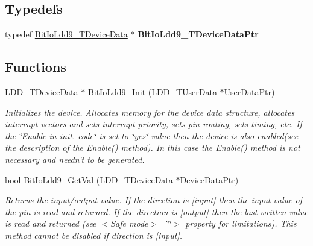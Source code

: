 \subsection*{Typedefs}
\begin{DoxyCompactItemize}
\item 
\hypertarget{group___bit_io_ldd9__module_ga14c5f1bba4476bfea732ee53bcbc3785}{typedef \hyperlink{struct_bit_io_ldd9___t_device_data}{Bit\-Io\-Ldd9\-\_\-\-T\-Device\-Data} $\ast$ {\bfseries Bit\-Io\-Ldd9\-\_\-\-T\-Device\-Data\-Ptr}}\label{group___bit_io_ldd9__module_ga14c5f1bba4476bfea732ee53bcbc3785}

\end{DoxyCompactItemize}
\subsection*{Functions}
\begin{DoxyCompactItemize}
\item 
\hyperlink{group___p_e___types__module_gac5cf1362f1f0e3a2ce71b1bf2276d091}{L\-D\-D\-\_\-\-T\-Device\-Data} $\ast$ \hyperlink{group___bit_io_ldd9__module_gad80d9c6b4e1521197f673e702034e626}{Bit\-Io\-Ldd9\-\_\-\-Init} (\hyperlink{group___p_e___types__module_ga0b66a73f87238a782318aa0be7578e35}{L\-D\-D\-\_\-\-T\-User\-Data} $\ast$User\-Data\-Ptr)
\begin{DoxyCompactList}\small\item\em Initializes the device. Allocates memory for the device data structure, allocates interrupt vectors and sets interrupt priority, sets pin routing, sets timing, etc. If the \char`\"{}\-Enable
    in init. code\char`\"{} is set to \char`\"{}yes\char`\"{} value then the device is also enabled(see the description of the Enable() method). In this case the Enable() method is not necessary and needn't to be generated. \end{DoxyCompactList}\item 
bool \hyperlink{group___bit_io_ldd9__module_gaebd043c61a2e886b4b8961e0932f25be}{Bit\-Io\-Ldd9\-\_\-\-Get\-Val} (\hyperlink{group___p_e___types__module_gac5cf1362f1f0e3a2ce71b1bf2276d091}{L\-D\-D\-\_\-\-T\-Device\-Data} $\ast$Device\-Data\-Ptr)
\begin{DoxyCompactList}\small\item\em Returns the input/output value. If the direction is \mbox{[}input\mbox{]} then the input value of the pin is read and returned. If the direction is \mbox{[}output\mbox{]} then the last written value is read and returned (see $<$\-Safe mode$>$=\char`\"{}\char`\"{}$>$ property for limitations). This method cannot be disabled if direction is \mbox{[}input\mbox{]}. \end{DoxyCompactList}\end{DoxyCompactItemize}


